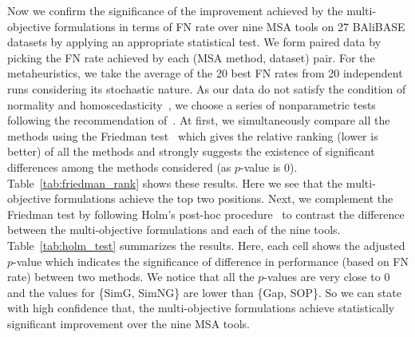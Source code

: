 Now we confirm the significance of the improvement achieved by the multi-objective formulations in terms of FN rate over nine MSA tools on 27 BAliBASE datasets by applying an appropriate statistical test. We form paired data by picking the FN rate achieved by each (MSA method, dataset) pair. For the metaheuristics, we take the average of the 20 best FN rates from 20 independent runs considering its stochastic nature. As our data do not satisfy the condition of normality and homoscedasticity~\citep{sheskin2003handbook}, we choose a series of  nonparametric tests following the recommendation of~\cite{derrac2011practical}. 
At first, we simultaneously compare all the methods using the Friedman test~\citep{friedman1937use} which gives the relative ranking (lower is better) of all the methods and strongly suggests the existence of significant differences among the methods considered (as $p$-value is 0). Table~\ref{tab:friedman_rank} shows these results. Here we see that the multi-objective formulations achieve the top two positions. 
Next, we complement the Friedman test by following Holm's post-hoc procedure~\citep{holm1979simple} to contrast the difference between the multi-objective formulations and each of the nine tools. Table~\ref{tab:holm_test} summarizes the results. Here, each cell shows the adjusted $p$-value which indicates the significance of difference in performance (based on FN rate) between two methods. We notice that all the $p$-values are very close to 0 and the values for \{SimG, SimNG\} are lower than \{Gap, SOP\}. So we can state with high confidence that, the multi-objective formulations achieve statistically significant improvement over the nine MSA tools.



